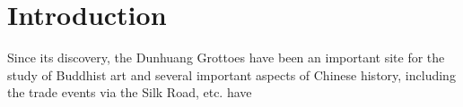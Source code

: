 \section{Introduction}

Since its discovery, the Dunhuang Grottoes have been an important site for the study of Buddhist art and
several important aspects of Chinese history, including the trade events via the Silk Road, etc.
 have

\printbibliography
